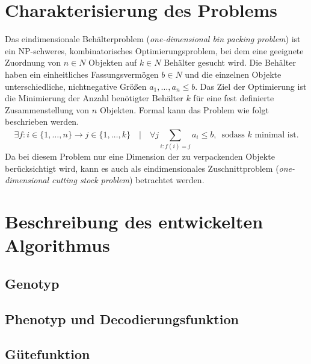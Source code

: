     \section{Charakterisierung des Problems}
    Das eindimensionale Behälterproblem (\textit{one-dimensional bin packing problem}) ist ein NP-schweres, kombinatorisches Optimierungsproblem, bei dem eine geeignete Zuordnung von $n \in N$ Objekten auf $k \in N$ Behälter gesucht wird. Die Behälter haben ein einheitliches Fassungsvermögen $b \in N$ und die einzelnen Objekte unterschiedliche, nichtnegative Größen $a_1, \dots ,a_n \le b$. Das Ziel der Optimierung ist die Minimierung der Anzahl benötigter Behälter $k$ für eine fest definierte Zusammenstellung von $n$ Objekten. Formal kann das Problem wie folgt beschrieben werden.
    $$\exists f: i \in \{1,\dots,n\} \rightarrow j \in \{1,\dots,k\} \quad | \quad \forall j \displaystyle\sum\limits_{i:f(i) = j}^{}{a_i \le b} \text{, }  \text{ sodass }k\text{ minimal ist.}$$
Da bei diesem Problem nur eine Dimension der zu verpackenden Objekte berücksichtigt wird, kann es auch als eindimensionales Zuschnittproblem (\textit{one-dimensional cutting stock problem}) betrachtet werden. \parencite[485]{KorteVygen:2008}
    
    \section{Beschreibung des entwickelten Algorithmus}
    \subsection{Genotyp}

    \subsection{Phenotyp und Decodierungsfunktion}

    \subsection{Gütefunktion}

